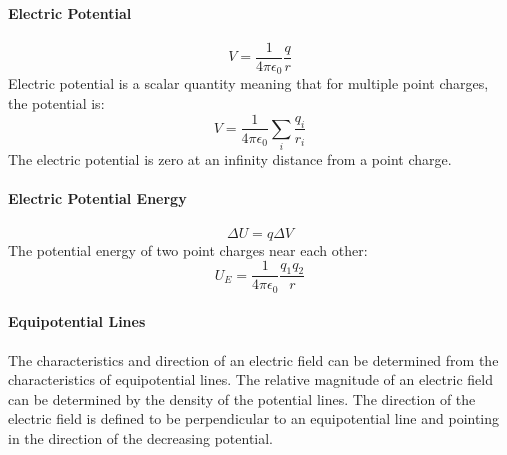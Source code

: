 \documentclass{article}
\begin{document}
            \paragraph{Electric Potential}
            \begin{equation}
                V = \frac{1}{4 \pi \epsilon_0} \frac{q}{r}
            \end{equation}
            Electric potential is a scalar quantity meaning that for multiple point charges, the potential is:
            \begin{equation}
                V = \frac{1}{4 \pi \epsilon_0} \sum_i \frac{q_i}{r_i}
            \end{equation}
            The electric potential is zero at an infinity distance from a point charge.

            \paragraph{Electric Potential Energy}
            \begin{equation}
                \Delta U = q \Delta V
            \end{equation}
            The potential energy of two point charges near each other:
            \begin{equation}
                U_E = \frac{1}{4 \pi \epsilon_0} \frac{q_1 q_2}{r}
            \end{equation}

            \paragraph{Equipotential Lines}
            The characteristics and direction of an electric field can be determined from the characteristics of equipotential lines. The relative magnitude of an electric field can be determined by the density of the potential lines. The direction of the electric field is defined to be perpendicular to an equipotential line and pointing in the direction of the decreasing potential.
\end{document}
